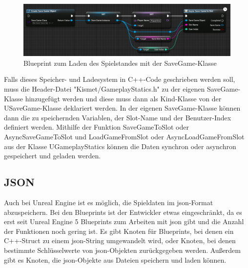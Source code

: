 \begin{figure}[htp]
    \centering
    \includegraphics[width=1\textwidth]{images/SaveGameBP.png}
    \caption{Blueprint zum Laden des Spielstandes mit der SaveGame-Klasse \cite{unrealengineSavingLoading}}
    \label{fig:unrealSaveGameBluePrintLoad}
\end{figure}

Falls dieses Speicher- und Ladesystem in C++-Code geschrieben werden soll, muss die Header-Datei "Kismet/GameplayStatics.h" zu der eigenen SaveGame-Klasse hinzugefügt werden und diese muss dann als Kind-Klasse von der USaveGame-Klasse deklariert werden. In der eigenen SaveGame-Klasse können dann die zu speichernden Variablen, der Slot-Name und der Benutzer-Index definiert werden. Mithilfe der Funktion SaveGameToSlot oder AsyncSaveGameToSlot und LoadGameFromSlot oder AsyncLoadGameFromSlot aus der Klasse UGameplayStatics können die Daten synchron oder asynchron gespeichert und geladen werden.\cite{unrealengineSavingLoading}



\subsection{JSON}
Auch bei Unreal Engine ist es möglich, die Spieldaten im \ac{json}-Format abzuspeichern. Bei den Blueprints ist der Entwickler etwas eingeschränkt, da es erst seit Unreal Engine 5 Blueprints zum Arbeiten mit \ac{json} gibt und die Anzahl der Funktionen noch gering ist. Es gibt Knoten für Blueprints, bei denen ein C++-Struct zu einem \ac{json}-String umgewandelt wird, oder Knoten, bei denen bestimmte Schlüsselwerte von \ac{json}-Objekten zurückgegeben werden. Außerdem gibt es Knoten, die \ac{json}-Objekte aus Dateien speichern und laden können.\cite{unrealengineJsonBlueprint}

